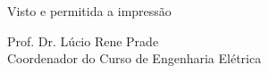 \begin{folhadeaprovacao}
    \vspace*{\fill}
    \begin{flushleft}
    	Visto e permitida a impressão\\
        \imprimirlocal
    \end{flushleft}
    
    \vspace*{\fill}
    \hspace{.4\textwidth}
    \begin{minipage}{.5\textwidth}
    	Prof. Dr. Lúcio Rene Prade \\
        Coordenador do Curso de Engenharia Elétrica
    \end{minipage}%
  
\end{folhadeaprovacao}